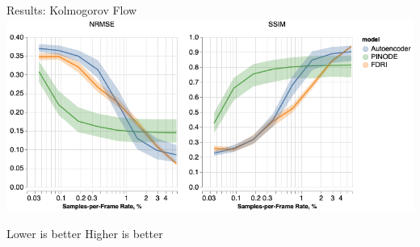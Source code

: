 \documentclass[8pt]{beamer}
\begin{document}
\begin{frame}{Results: Kolmogorov Flow}
	\includegraphics[width=\textwidth]{Figures/cs_kolm_aggregate.png}
	
	 \hspace{5em} Lower is better \hspace{9em} Higher is better
\end{frame}
\end{document}
